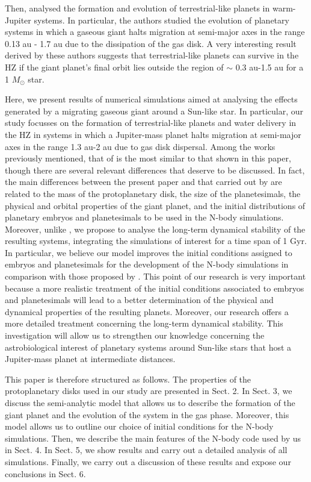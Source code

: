 \documentclass{aa}
\begin{document}
Then, \citet{Fogg2009} analysed the formation and evolution of terrestrial-like planets in warm-Jupiter systems. In particular, the
authors studied the evolution of planetary systems in which a gaseous giant halts migration at semi-major axes in the range 0.13 au - 1.7 au
due to the dissipation of the gas disk. A very interesting result derived by these authors suggests that terrestrial-like planets can
survive in the HZ if the giant planet's final orbit lies outside the region of $\sim$ 0.3 au-1.5 au for a 1 $M_\odot$ star.

Here, we present results of numerical simulations aimed at analysing the effects generated by a migrating gaseous giant
around a Sun-like star. In particular, our study focusses on the formation of terrestrial-like planets and water delivery in the HZ
in systems in which a Jupiter-mass planet halts migration at semi-major axes in the range 1.3 au-2 au due to gas disk dispersal.
Among the works previously mentioned, that of \citet{Fogg2009} is the most similar to that shown in this paper, though
there are several relevant differences that deserve to be discussed. In fact, the main differences between the present paper and that
carried out by \citet{Fogg2009} are related to the mass of the protoplanetary disk, the size of the planetesimals, the physical
and orbital properties of the giant planet, and the initial distributions of planetary embryos and planetesimals to be used in the
N-body simulations. Moreover, unlike \citet{Fogg2009}, we propose to analyse the long-term dynamical stability of the resulting
systems, integrating the simulations of interest for a time span of 1 Gyr. In particular, we believe our model improves the
initial conditions assigned to embryos and planetesimals for the development of the N-body simulations in comparison with those proposed
by \citet{Fogg2009}. This point of our research is very important because a more realistic treatment of the initial conditions
associated to embryos and planetesimals will lead to a better determination of the physical and dynamical properties of the resulting
planets. Moreover, our research offers a more detailed treatment concerning the long-term dynamical stability.
This investigation will allow us to strengthen our knowledge concerning the astrobiological interest of planetary systems around Sun-like
stars that host a Jupiter-mass planet at intermediate distances.

This paper is therefore structured as follows. The properties of the protoplanetary disks used in our study are presented in Sect. 2.
In Sect. 3, we discuss the semi-analytic model that allows us to describe the formation of the giant planet and the evolution of
the system in the gas phase. Moreover, this model allows us to outline our choice of initial conditions for the N-body simulations.
Then, we describe the main features of the N-body code used by us in Sect. 4. In Sect. 5, we show results and carry out
a detailed analysis of all simulations. Finally, we carry out a discussion of these results and expose our conclusions in Sect. 6.
\end{document}
